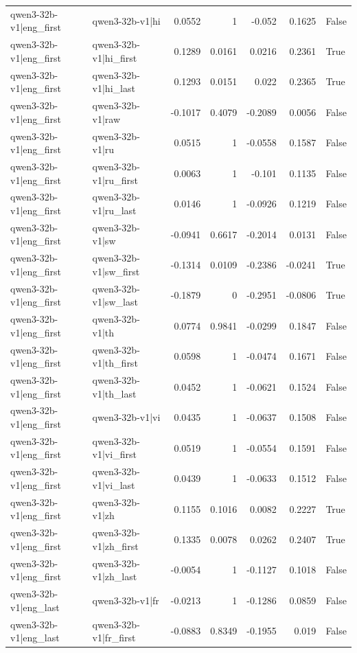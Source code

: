 \begin{table}
\begin{tabular}{l l r r r r l}
qwen3-32b-v1|eng_first & qwen3-32b-v1|hi & 0.0552 & 1 & -0.052 & 0.1625 & False \\
qwen3-32b-v1|eng_first & qwen3-32b-v1|hi_first & 0.1289 & 0.0161 & 0.0216 & 0.2361 & True \\
qwen3-32b-v1|eng_first & qwen3-32b-v1|hi_last & 0.1293 & 0.0151 & 0.022 & 0.2365 & True \\
qwen3-32b-v1|eng_first & qwen3-32b-v1|raw & -0.1017 & 0.4079 & -0.2089 & 0.0056 & False \\
qwen3-32b-v1|eng_first & qwen3-32b-v1|ru & 0.0515 & 1 & -0.0558 & 0.1587 & False \\
qwen3-32b-v1|eng_first & qwen3-32b-v1|ru_first & 0.0063 & 1 & -0.101 & 0.1135 & False \\
qwen3-32b-v1|eng_first & qwen3-32b-v1|ru_last & 0.0146 & 1 & -0.0926 & 0.1219 & False \\
qwen3-32b-v1|eng_first & qwen3-32b-v1|sw & -0.0941 & 0.6617 & -0.2014 & 0.0131 & False \\
qwen3-32b-v1|eng_first & qwen3-32b-v1|sw_first & -0.1314 & 0.0109 & -0.2386 & -0.0241 & True \\
qwen3-32b-v1|eng_first & qwen3-32b-v1|sw_last & -0.1879 & 0 & -0.2951 & -0.0806 & True \\
qwen3-32b-v1|eng_first & qwen3-32b-v1|th & 0.0774 & 0.9841 & -0.0299 & 0.1847 & False \\
qwen3-32b-v1|eng_first & qwen3-32b-v1|th_first & 0.0598 & 1 & -0.0474 & 0.1671 & False \\
qwen3-32b-v1|eng_first & qwen3-32b-v1|th_last & 0.0452 & 1 & -0.0621 & 0.1524 & False \\
qwen3-32b-v1|eng_first & qwen3-32b-v1|vi & 0.0435 & 1 & -0.0637 & 0.1508 & False \\
qwen3-32b-v1|eng_first & qwen3-32b-v1|vi_first & 0.0519 & 1 & -0.0554 & 0.1591 & False \\
qwen3-32b-v1|eng_first & qwen3-32b-v1|vi_last & 0.0439 & 1 & -0.0633 & 0.1512 & False \\
qwen3-32b-v1|eng_first & qwen3-32b-v1|zh & 0.1155 & 0.1016 & 0.0082 & 0.2227 & True \\
qwen3-32b-v1|eng_first & qwen3-32b-v1|zh_first & 0.1335 & 0.0078 & 0.0262 & 0.2407 & True \\
qwen3-32b-v1|eng_first & qwen3-32b-v1|zh_last & -0.0054 & 1 & -0.1127 & 0.1018 & False \\
qwen3-32b-v1|eng_last & qwen3-32b-v1|fr & -0.0213 & 1 & -0.1286 & 0.0859 & False \\
qwen3-32b-v1|eng_last & qwen3-32b-v1|fr_first & -0.0883 & 0.8349 & -0.1955 & 0.019 & False \\

\end{tabular}
\end{table}
